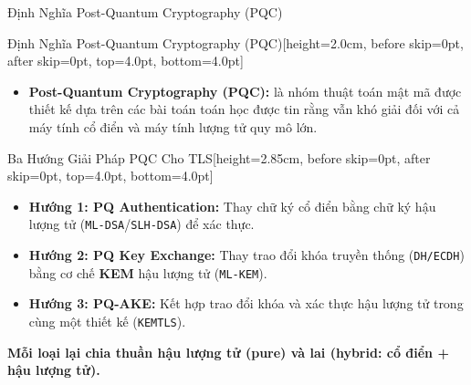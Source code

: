 \documentclass[aspectratio=169, 10pt]{beamer}
\begin{document}
\begin{frame}{Định Nghĩa Post-Quantum Cryptography (PQC)}
	\begin{accentcard}[uetblue]{Định Nghĩa Post-Quantum Cryptography (PQC)}[height=2.0cm, before skip=0pt, after skip=0pt, top=4.0pt, bottom=4.0pt]
		\raggedright
		\setlength{\leftmargini}{9pt}
		\begin{itemize}\fontsize{6.3pt}{8.0pt}\selectfont
			\item \textbf{Post-Quantum Cryptography (PQC):} là nhóm thuật toán mật mã được thiết kế dựa trên các bài toán toán học được tin rằng vẫn khó giải đối với cả máy tính cổ điển và máy tính lượng tử quy mô lớn.
		\end{itemize}
	\end{accentcard}\par\nointerlineskip\vspace{0.10cm}\noindent
	\begin{accentcard}[uetgreen]{Ba Hướng Giải Pháp PQC Cho TLS}[height=2.85cm, before skip=0pt, after skip=0pt, top=4.0pt, bottom=4.0pt]
		\raggedright
		\setlength{\leftmargini}{9pt}
		\begin{itemize}\setlength{\itemsep}{3.0pt}\fontsize{6.2pt}{7.8pt}\selectfont
			\item \textbf{Hướng 1: PQ Authentication:} Thay chữ ký cổ điển bằng chữ ký hậu lượng tử (\texttt{ML-DSA}/\texttt{SLH-DSA}) để xác thực.
			\item \textbf{Hướng 2: PQ Key Exchange:} Thay trao đổi khóa truyền thống (\texttt{DH/ECDH}) bằng cơ chế \textbf{KEM} hậu lượng tử (\texttt{ML-KEM}).
			\item \textbf{Hướng 3: PQ-AKE:} Kết hợp trao đổi khóa và xác thực hậu lượng tử trong cùng một thiết kế (\texttt{KEMTLS}).
		\end{itemize}
	\end{accentcard}\par\nointerlineskip\vspace{0.08cm}\noindent
	\begin{uetcard}[colback=uetaccentbg, height=0.65cm, before skip=0pt, after skip=0pt, valign=center, top=1.0pt, bottom=1.0pt, left=6pt, right=6pt]
		\centering\fontsize{6.0pt}{7.2pt}\selectfont\textbf{\color{uetblue}Mỗi loại lại chia thuần hậu lượng tử (pure) và lai (hybrid: cổ điển + hậu lượng tử).}
	\end{uetcard}
\end{frame}
\end{document}
